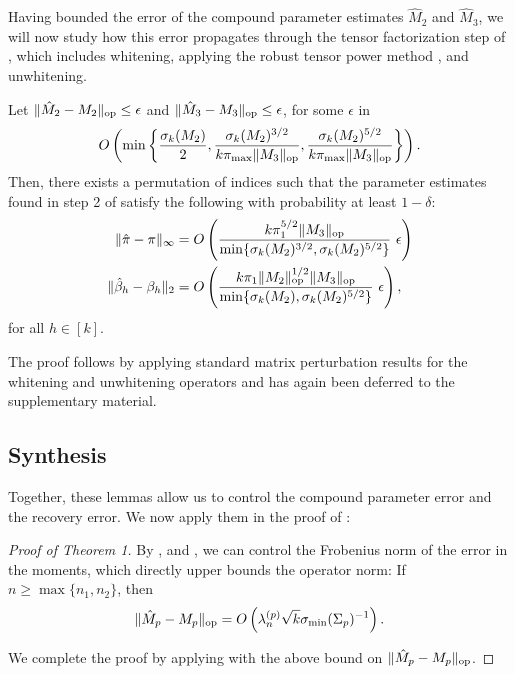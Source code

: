 Having bounded the error of the compound parameter estimates $\hat M_2$ and $\hat M_3$,
we will now study how this error propagates through the tensor factorization step of 
,
which includes whitening, applying the robust tensor power method \cite{AnandkumarGeHsu2012},
and unwhitening.
\begin{lemma}
  \label{lem:tensorPower} Let $\|\hat M_2 - M_2\|_{\text{\rm op}} \le \epsilon$ and
  $\|\hat M_3 - M_3\|_{\text{\rm op}} \le \epsilon$, for some $\epsilon$ in
  $$O\left( \min\left\{ 
    \frac{\sigma_k(M_2)}{2}, 
    \frac{\sigma_k(M_2)^{3/2}}{k \pi_{\max} \|M_3\|_{\text{\rm op}}},
    \frac{\sigma_k(M_2)^{5/2}}{k \pi_{\max} \|M_3\|_{\text{\rm op}}} 
    \right\}\right).$$ 
  Then, there exists a permutation of indices such that  the parameter
  estimates found in step 2 of 
  satisfy the following with probability at least $1 - \delta$:
  \begin{align*}
  \|\hat \pi - \pi \|_{\infty}
  &= O\left(\frac{k \pi_1^{5/2}\| {M_3} \|_{\text{\rm op}}}{\min\{ \sigma_k(M_2)^{3/2}, \sigma_k(M_2)^{5/2} \}} ~ \epsilon \right) \\
  \|\hat \beta_h - \beta_h\|_2
  &= O\left( \frac{k \pi_1 \|M_2\|_{\text{\rm op}}^{1/2} \| {M_3} \|_{\text{\rm op}}}{\min\{ \sigma_k(M_2), \sigma_k(M_2)^{5/2} \}}~ \epsilon \right),
  \end{align*}
  for all $h \in [k]$.
\end{lemma}

The proof follows by applying standard matrix perturbation results for
the whitening and unwhitening operators and has again been deferred
to the supplementary material.

\subsection{Synthesis}
Together, these lemmas allow us to control the compound parameter error
and the recovery error. We now apply them in the proof of
:

\begin{proof}[Proof of Theorem 1]
By ,  and , we
can control the Frobenius norm of the error in the moments, which
directly upper bounds the operator norm: If $n \ge \max\{n_1, n_2\}$,
then
\begin{align}
  \|\hat M_p - M_p\|_{\text{\rm op}} = O\left( \lambda_n^{(p)} \sqrt{k} \sigma_\text{\rm min}(\Sigma_p)^{-1} \right).
\end{align}

We complete the proof by applying  with the above
bound on $\|\hat M_p - M_p\|_{\text{\rm op}}$.

\end{proof}

